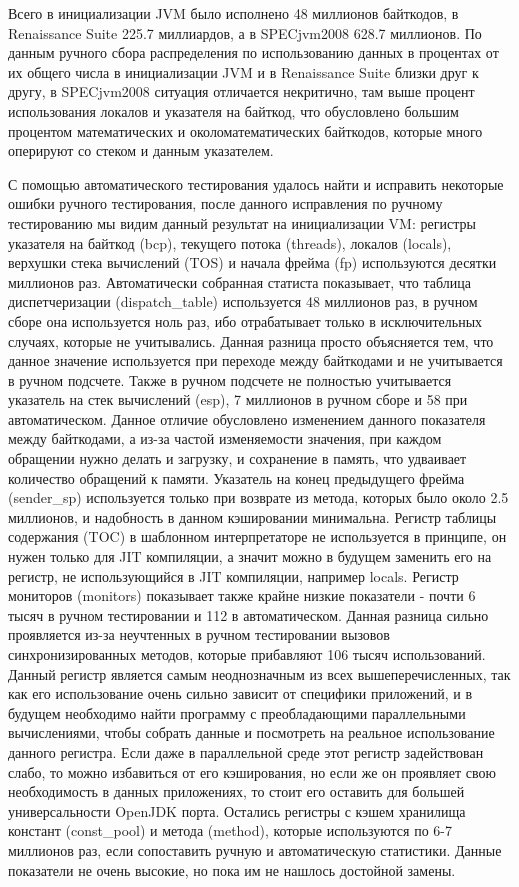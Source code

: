 Всего в инициализации JVM было исполнено 48 миллионов байткодов, в Renaissance Suite 225.7 миллиардов, а в SPECjvm2008 628.7 миллионов. По данным ручного сбора распределения по использованию данных в процентах от их общего числа в инициализации JVM и в Renaissance Suite близки друг к другу, в SPECjvm2008 ситуация отличается некритично, там выше процент использования локалов и указателя на байткод, что обусловлено большим процентом математических и околоматематических байткодов, которые много оперируют со стеком и данным указателем.

С помощью автоматического тестирования удалось найти и исправить некоторые ошибки ручного тестирования, после данного исправления по ручному тестированию мы видим данный результат на инициализации VM: регистры указателя на байткод (bcp), текущего потока (threads), локалов (locals), верхушки стека вычислений (TOS) и начала фрейма (fp) используются десятки миллионов раз. Автоматически собранная статиста показывает, что таблица диспетчеризации (dispatch\_table) используется 48 миллионов раз, в ручном сборе она используется ноль раз, ибо отрабатывает только в исключительных случаях, которые не учитывались. Данная разница просто объясняется тем, что данное значение используется при переходе между байткодами и не учитывается в ручном подсчете. Также в ручном подсчете не полностью учитывается указатель на стек вычислений (esp), 7 миллионов в ручном сборе и 58 при автоматическом. Данное отличие обусловлено изменением данного показателя между байткодами, а из-за частой изменяемости значения, при каждом обращении нужно делать и загрузку, и сохранение в память, что удваивает количество обращений к памяти. Указатель на конец предыдущего фрейма (sender\_sp) используется только при возврате из метода, которых было около 2.5 миллионов, и надобность в данном кэшировании минимальна. Регистр таблицы содержания (TOC) в шаблонном интерпретаторе не используется в принципе, он нужен только для JIT компиляции, а значит можно в будущем заменить его на регистр, не использующийся в JIT компиляции, например locals. Регистр мониторов (monitors) показывает также крайне низкие показатели - почти 6 тысяч в ручном тестировании и 112 в автоматическом. Данная разница сильно проявляется из-за неучтенных в ручном тестировании вызовов синхронизированных методов, которые прибавляют 106 тысяч использований. Данный регистр является самым неоднозначным из всех вышеперечисленных, так как его использование очень сильно зависит от специфики приложений, и в будущем необходимо найти программу с преобладающими параллельными вычислениями, чтобы собрать данные и посмотреть на реальное использование данного регистра. Если даже в параллельной среде этот регистр задействован слабо, то можно избавиться от его кэширования, но если же он проявляет свою необходимость в данных приложениях, то стоит его оставить для большей универсальности OpenJDK порта. Остались регистры с кэшем хранилища констант (const\_pool) и метода (method), которые используются по 6-7 миллионов раз, если сопоставить ручную и автоматическую статистики. Данные показатели не очень высокие, но пока им не нашлось достойной замены.

